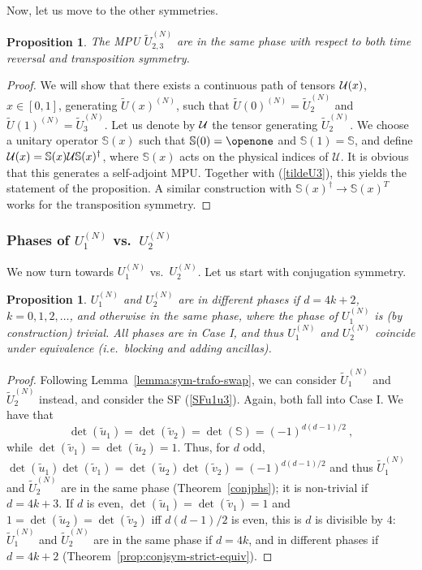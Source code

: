 \documentclass[pra,twocolumn,nofootinbib,superscriptaddress]{revtex4-1}
\def\Id{{\openone}}
\newtheorem{prop}[thm]{Proposition}
\begin{document}
Now, let us move to the other symmetries.
\begin{prop}
	\label{prop:U2-U3-trivial-tr-transpose}
	The MPU $\tilde U_{2,3}^{(N)}$ are in the same phase with respect to both
	time reversal and transposition symmetry.
\end{prop}

\begin{proof}
	We will show that there exists a continuous path of tensors ${\cal U}(x)$,
	$x\in [0,1]$, generating $\tilde U(x)^{(N)}$, such that $\tilde
		U(0)^{(N)}=\tilde U_2^{(N)}$ and $\tilde U(1)^{(N)}=\tilde U_3^{(N)}$.
	Let us denote by ${\cal U}$ the tensor generating $\tilde
		U_2^{(N)}$. We choose a unitary operator $\mathbb S(x)$ such that $\mathbb S(0)=\Id$ and
	$\mathbb S(1)=\mathbb S$, and define ${\cal U}(x)=\mathbb S(x){\cal
				U}\mathbb S(x)^\dagger$, where $\mathbb S(x)$ acts on
	the physical indices of $\mathcal U$. It is obvious that this generates a
	self-adjoint MPU.  Together with (\ref{tildeU3}), this yields the
	statement of the proposition. A similar construction with $\mathbb S(x)^\dagger\to
		\mathbb S(x)^T$ works for the transposition symmetry.
\end{proof}


\subsubsection{Phases of $U_1^{(N)}$ vs.\ $U_2^{(N)}$}

We now turn towards $U_1^{(N)}$ vs.\ $U_2^{(N)}$.
Let us start with conjugation symmetry.

\begin{prop}
	\label{prop:eqiv-U1-U2-conjugate}
	$U_1^{(N)}$ and $U_2^{(N)}$ are in different phases if $d=4k+2$,
	$k=0,1,2,\dots$, and otherwise in the same phase, where the phase of
	$U_1^{(N)}$ is (by construction) trivial.
	All phases are in Case I, and thus
	$U_1^{(N)}$ and $U_2^{(N)}$ coincide under equivalence (i.e.\ blocking and
	adding ancillas).
\end{prop}


\begin{proof}
	Following Lemma~\ref{lemma:sym-trafo-swap}, we can consider $\tilde
		U_1^{(N)}$ and $\tilde U_2^{(N)}$ instead, and consider the SF
	(\ref{SFu1u3}). Again, both fall into Case I. We have that
	\[
		\det(\tilde u_1)=\det(\tilde v_2)=\det(\mathbb S)=(-1)^{d(d-1)/2}\ ,
	\]
	while $\det(\tilde v_1)=\det(\tilde u_2)=1$. Thus, for $d$ odd,
	$\det(\tilde u_1)\det(\tilde v_1)=\det(\tilde u_2)\det(\tilde
		v_2)=(-1)^{d(d-1)/2}$ and thus
	$\tilde U_1^{(N)}$ and $\tilde U_2^{(N)}$ are in the same phase
	(Theorem~\ref{conjphs}); it is non-trivial if $d=4k+3$.  If $d$ is even,
	$\det(\tilde u_1)=\det(\tilde v_1)=1$ and $1=\det(\tilde u_2)=\det(\tilde
		v_2)$ iff $d(d-1)/2$ is even, this is $d$ is divisible by $4$: $\tilde
		U_1^{(N)}$ and $\tilde U_2^{(N)}$ are in the same phase if $d=4k$, and in
	different phases if $d=4k+2$ (Theorem~\ref{prop:conjsym-strict-equiv}).
\end{proof}
\end{document}
